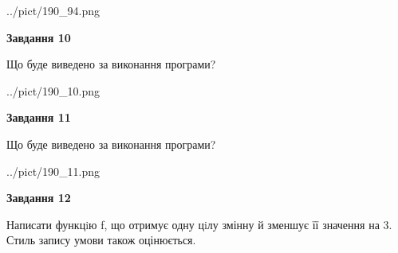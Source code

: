 \documentclass[12pt, ukrainian]{article}
\begin{document}
{\begin {large}
\begin{center}
	{../pict/190_94.png}
\end{center}
\newpage

{\begin {center}\textbf{Завдання 10}\end {center}}

Що буде виведено за виконання програми?\par
\begin{center}
	{../pict/190_10.png}
\end{center}
\newpage

{\begin {center}\textbf{Завдання 11}\end {center}}

Що буде виведено за виконання програми?\par
\begin{center}
	{../pict/190_11.png}
\end{center}
\newpage

{\begin {center}\textbf{Завдання 12}\end {center}}


Написати функцiю f, що отримує одну цiлу змінну й зменшує її значення на 3. Стиль запису умови також оцінюється.\par
\newpage

\end {large}}
\end{document}
